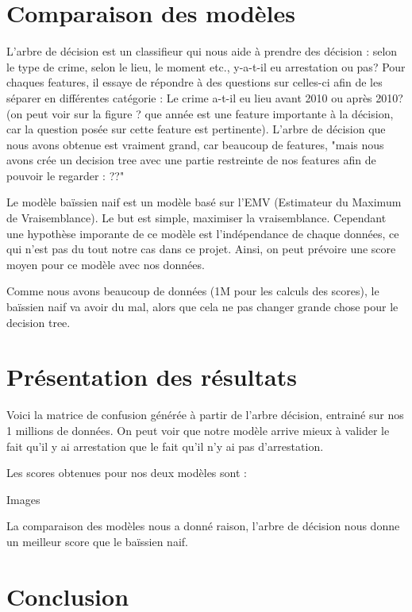 \documentclass{article}
\begin{document}
    \section{Comparaison des modèles}

    L'arbre de décision est un classifieur qui nous aide à prendre des décision : selon le type de crime, selon le lieu, le moment etc., y-a-t-il eu arrestation ou pas? Pour chaques features, il essaye de répondre à des questions sur celles-ci afin de les séparer en différentes catégorie : Le crime a-t-il eu lieu avant 2010 ou après 2010? (on peut voir sur la figure ? que année est une feature importante à la décision, car la question posée sur cette feature est pertinente).
    L'arbre de décision que nous avons obtenue est vraiment grand, car beaucoup de features, "mais nous avons crée un decision tree avec une partie restreinte de nos features afin de pouvoir le regarder : ??"

    Le modèle baïssien naif est un modèle basé sur l'EMV (Estimateur du Maximum de Vraisemblance). Le but est simple, maximiser la vraisemblance. Cependant une hypothèse imporante de ce modèle est l'indépendance de chaque données, ce qui n'est pas du tout notre cas dans ce projet. Ainsi, on peut prévoire une score moyen pour ce modèle avec nos données.
    
    Comme nous avons beaucoup de données (1M pour les calculs des scores), le baïssien naif va avoir du mal, alors que cela ne pas changer grande chose pour le decision tree.

    \section{Présentation des résultats}

    Voici la matrice de confusion générée à partir de l'arbre décision, entrainé sur nos 1 millions de données. On peut voir que notre modèle arrive mieux à valider le fait qu'il y ai arrestation que le fait qu'il n'y ai pas d'arrestation.

    Les scores obtenues pour nos deux modèles sont :

    Images

    La comparaison des modèles nous a donné raison, l'arbre de décision nous donne un meilleur score que le baïssien naif. 

    \section{Conclusion}
\end{document}

